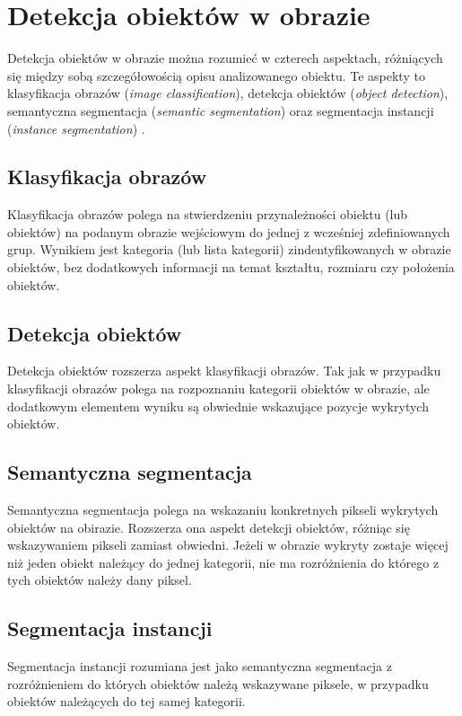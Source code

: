 \section{Detekcja obiektów w obrazie}
\label{sec:typy_detekcji}

Detekcja obiektów w obrazie można rozumieć w czterech aspektach, różniących się między sobą szczegółowością opisu analizowanego obiektu. Te aspekty to klasyfikacja obrazów (\textit{image classification}), detekcja obiektów (\textit{object detection}), semantyczna segmentacja (\textit{semantic segmentation}) oraz segmentacja instancji (\textit{instance segmentation}) \cite{survey-of-object-classification}.

\subsection*{Klasyfikacja obrazów}
Klasyfikacja obrazów polega na stwierdzeniu przynależności obiektu (lub obiektów) na podanym obrazie wejściowym do jednej z wcześniej zdefiniowanych grup. Wynikiem jest kategoria (lub lista kategorii) zindentyfikowanych w obrazie obiektów, bez dodatkowych informacji na temat kształtu, rozmiaru czy położenia obiektów. 
\subsection*{Detekcja obiektów}
Detekcja obiektów rozszerza aspekt klasyfikacji obrazów. Tak jak w przypadku klasyfikacji obrazów polega na rozpoznaniu kategorii obiektów w obrazie, ale dodatkowym elementem wyniku są obwiednie wskazujące pozycje wykrytych obiektów.
\subsection*{Semantyczna segmentacja}
Semantyczna segmentacja polega na wskazaniu konkretnych pikseli wykrytych obiektów na obirazie. Rozszerza ona aspekt detekcji obiektów, różniąc się wskazywaniem pikseli zamiast obwiedni. Jeżeli w obrazie wykryty zostaje więcej niż jeden obiekt należący do jednej kategorii, nie ma rozróżnienia do którego z tych obiektów należy dany piksel.
\subsection*{Segmentacja instancji}
Segmentacja instancji rozumiana jest jako semantyczna segmentacja z rozróżnieniem do których obiektów należą wskazywane piksele, w przypadku obiektów należących do tej samej kategorii.

